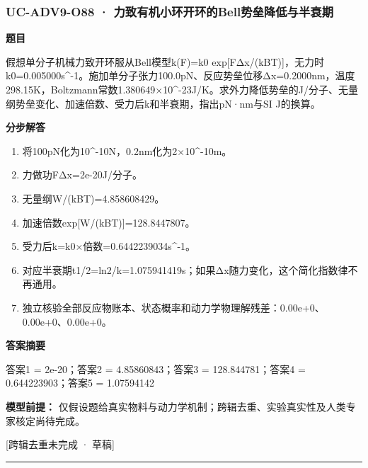 \documentclass[UTF8,11pt,a4paper]{ctexart}
\begin{document}
\subsubsection*{UC-ADV9-O88 · 力致有机小环开环的Bell势垒降低与半衰期}
\noindent\textbf{题目}\par
假想单分子机械力致开环服从Bell模型k(F)=k0 exp[FΔx/(kBT)]，无力时k0=0.005000s\textasciicircum{}-1。施加单分子张力100.0pN、反应势垒位移Δx=0.2000nm，温度298.15K，Boltzmann常数1.380649×10\textasciicircum{}-23J/K。求外力降低势垒的J/分子、无量纲势垒变化、加速倍数、受力后k和半衰期，指出pN·nm与SI J的换算。\par
\medskip\noindent\textbf{分步解答}
\begin{enumerate}
\item 将100pN化为10\textasciicircum{}-10N，0.2nm化为2×10\textasciicircum{}-10m。
\item 力做功FΔx=2e-20J/分子。
\item 无量纲W/(kBT)=4.858608429。
\item 加速倍数exp[W/(kBT)]=128.8447807。
\item 受力后k=k0×倍数=0.6442239034s\textasciicircum{}-1。
\item 对应半衰期t1/2=ln2/k=1.075941419s；如果Δx随力变化，这个简化指数律不再通用。
\item 独立核验全部反应物账本、状态概率和动力学物理解残差：0.00e+0、0.00e+0、0.00e+0。
\end{enumerate}
\noindent\textbf{答案摘要}\par
答案1 = 2e-20；答案2 = 4.85860843；答案3 = 128.844781；答案4 = 0.644223903；答案5 = 1.07594142\par
\noindent\textbf{模型前提：}
仅假设题给真实物料与动力学机制；跨辑去重、实验真实性及人类专家核定尚待完成。\par
\noindent\textcolor{red!65!black}{[跨辑去重未完成 · 草稿]} \par
\medskip\hrule\medskip
{}
\end{document}
